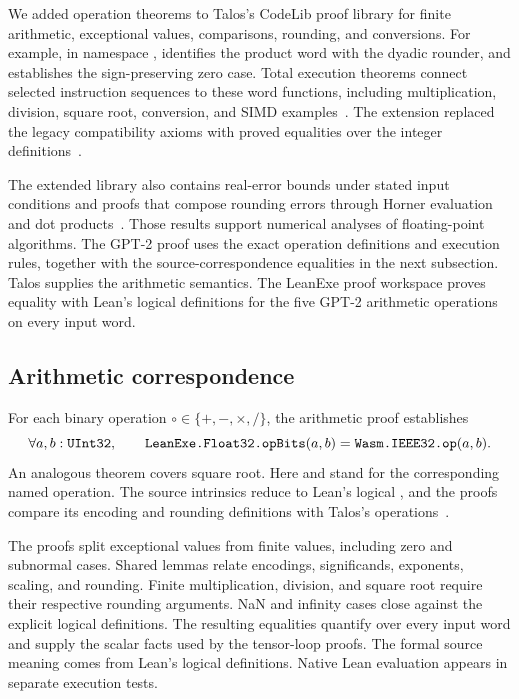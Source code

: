We added operation theorems to Talos's CodeLib proof library for finite arithmetic, exceptional values, comparisons, rounding, and conversions.  For example, in namespace ,  identifies the product word with the dyadic rounder, and  establishes the sign-preserving zero case.  Total execution theorems connect selected instruction sequences to these word functions, including multiplication, division, square root, conversion, and SIMD examples~\cite{talosfpproofs}.  The extension replaced the legacy  compatibility axioms with proved equalities over the integer definitions~\cite{taloscompat}.

The extended library also contains real-error bounds under stated input conditions and proofs that compose rounding errors through Horner evaluation and dot products~\cite{talosnumeric}.  Those results support numerical analyses of floating-point algorithms.  The GPT-2 proof uses the exact operation definitions and execution rules, together with the source-correspondence equalities in the next subsection.  Talos supplies the arithmetic semantics.  The LeanExe proof workspace proves equality with Lean's logical  definitions for the five GPT-2 arithmetic operations on every input word.

\subsection{Arithmetic correspondence}

For each binary operation $\circ\in\{+,-,\times,/\}$, the arithmetic proof establishes
\[
\forall a,b:\texttt{UInt32},\qquad
\texttt{LeanExe.Float32.opBits}(a,b)
=\texttt{Wasm.IEEE32.op}(a,b).
\]
An analogous theorem covers square root.  Here  and  stand for the corresponding named operation.  The source intrinsics reduce to Lean's logical , and the proofs compare its encoding and rounding definitions with Talos's  operations~\cite{f32,leanfloat}.

The proofs split exceptional values from finite values, including zero and subnormal cases.  Shared lemmas relate encodings, significands, exponents, scaling, and rounding.  Finite multiplication, division, and square root require their respective rounding arguments.  NaN and infinity cases close against the explicit logical definitions.  The resulting equalities quantify over every input word and supply the scalar facts used by the tensor-loop proofs.  The formal source meaning comes from Lean's logical definitions.  Native Lean evaluation appears in separate execution tests.


